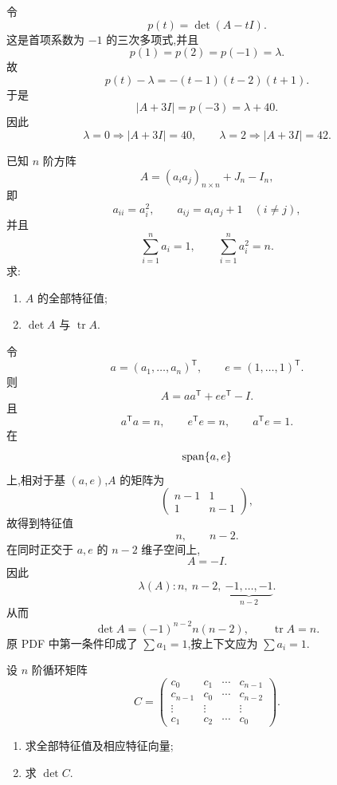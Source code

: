 \begin{solution}
令
\[
p(t)=\det(A-tI).
\]
这是首项系数为 $-1$ 的三次多项式,并且
\[
p(1)=p(2)=p(-1)=\lambda.
\]
故
\[
p(t)-\lambda=-(t-1)(t-2)(t+1).
\]
于是
\[
|A+3I|=p(-3)=\lambda+40.
\]
因此
\[
\boxed{
\lambda=0\Rightarrow |A+3I|=40,
\qquad
\lambda=2\Rightarrow |A+3I|=42.
}
\]
\end{solution}


\begin{example}
已知 $n$ 阶方阵
\[
A=(a_ia_j)_{n\times n}+J_n-I_n,
\]
即
\[
a_{ii}=a_i^2,\qquad
a_{ij}=a_ia_j+1\quad(i\neq j),
\]
并且
\[
\displaystyle\sum\limits_{i=1}^{n}a_i=1,
\qquad
\sum\limits_{i=1}^{n}a_i^2=n.
\]
求:
\begin{enumerate}
    \item $A$ 的全部特征值;
    \item $\det A$ 与 $\operatorname{tr}A$.
\end{enumerate}
\end{example}
\exampleblank

\begin{solution}
令
\[
a=(a_1,\ldots,a_n)^{\mathsf T},
\qquad
e=(1,\ldots,1)^{\mathsf T}.
\]
则
\[
A=aa^{\mathsf T}+ee^{\mathsf T}-I.
\]
且
\[
a^{\mathsf T}a=n,\qquad
e^{\mathsf T}e=n,\qquad
a^{\mathsf T}e=1.
\]
在
\[
\operatorname{span}\{a,e\}
\]
上,相对于基 $(a,e)$,$A$ 的矩阵为
\[
\begin{pmatrix}
n-1&1\\
1&n-1
\end{pmatrix},
\]
故得到特征值
\[
n,\qquad n-2.
\]
在同时正交于 $a,e$ 的 $n-2$ 维子空间上,
\[
A=-I.
\]
因此
\[
\boxed{
\lambda(A):
n,\ n-2,\ \underbrace{-1,\ldots,-1}_{n-2}
}.
\]
从而
\[
\boxed{
\det A=(-1)^{n-2}n(n-2),
\qquad
\operatorname{tr}A=n.
}
\]
原 PDF 中第一条件印成了 $\displaystyle\sum a_1=1$,按上下文应为 $\displaystyle\sum a_i=1$.
\end{solution}


\begin{example}[\markstar]
设 $n$ 阶循环矩阵
\[
C=
\begin{pmatrix}
c_0&c_1&\cdots&c_{n-1}\\
c_{n-1}&c_0&\cdots&c_{n-2}\\
\vdots&\vdots&&\vdots\\
c_1&c_2&\cdots&c_0
\end{pmatrix}.
\]
\begin{enumerate}
    \item 求全部特征值及相应特征向量;
    \item 求 $\det C$.
\end{enumerate}
\end{example}
\exampleblank

